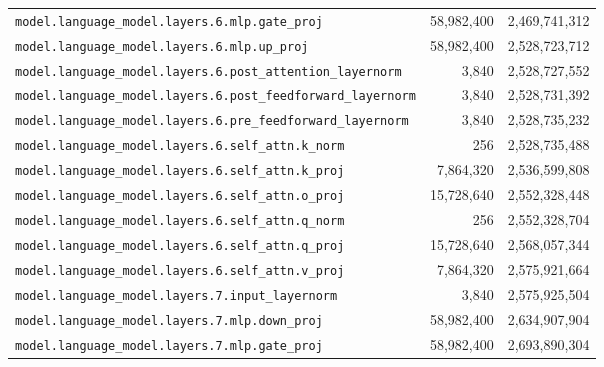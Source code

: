 \documentclass[10pt,a4paper]{article}
\theoremstyle{definition}
\begin{document}
\begin{appendices}
\begin{longtable}{p{9.5cm}rr}
\texttt{model.\allowbreak{}language\_model.\allowbreak{}layers.\allowbreak{}6.\allowbreak{}mlp.\allowbreak{}gate\_proj} & 58,982,400 & 2,469,741,312 \\
\texttt{model.\allowbreak{}language\_model.\allowbreak{}layers.\allowbreak{}6.\allowbreak{}mlp.\allowbreak{}up\_proj} & 58,982,400 & 2,528,723,712 \\
\texttt{model.\allowbreak{}language\_model.\allowbreak{}layers.\allowbreak{}6.\allowbreak{}post\_attention\_layernorm} & 3,840 & 2,528,727,552 \\
\texttt{model.\allowbreak{}language\_model.\allowbreak{}layers.\allowbreak{}6.\allowbreak{}post\_feedforward\_layernorm} & 3,840 & 2,528,731,392 \\
\texttt{model.\allowbreak{}language\_model.\allowbreak{}layers.\allowbreak{}6.\allowbreak{}pre\_feedforward\_layernorm} & 3,840 & 2,528,735,232 \\
\texttt{model.\allowbreak{}language\_model.\allowbreak{}layers.\allowbreak{}6.\allowbreak{}self\_attn.\allowbreak{}k\_norm} & 256 & 2,528,735,488 \\
\texttt{model.\allowbreak{}language\_model.\allowbreak{}layers.\allowbreak{}6.\allowbreak{}self\_attn.\allowbreak{}k\_proj} & 7,864,320 & 2,536,599,808 \\
\texttt{model.\allowbreak{}language\_model.\allowbreak{}layers.\allowbreak{}6.\allowbreak{}self\_attn.\allowbreak{}o\_proj} & 15,728,640 & 2,552,328,448 \\
\texttt{model.\allowbreak{}language\_model.\allowbreak{}layers.\allowbreak{}6.\allowbreak{}self\_attn.\allowbreak{}q\_norm} & 256 & 2,552,328,704 \\
\texttt{model.\allowbreak{}language\_model.\allowbreak{}layers.\allowbreak{}6.\allowbreak{}self\_attn.\allowbreak{}q\_proj} & 15,728,640 & 2,568,057,344 \\
\texttt{model.\allowbreak{}language\_model.\allowbreak{}layers.\allowbreak{}6.\allowbreak{}self\_attn.\allowbreak{}v\_proj} & 7,864,320 & 2,575,921,664 \\
\texttt{model.\allowbreak{}language\_model.\allowbreak{}layers.\allowbreak{}7.\allowbreak{}input\_layernorm} & 3,840 & 2,575,925,504 \\
\texttt{model.\allowbreak{}language\_model.\allowbreak{}layers.\allowbreak{}7.\allowbreak{}mlp.\allowbreak{}down\_proj} & 58,982,400 & 2,634,907,904 \\
\texttt{model.\allowbreak{}language\_model.\allowbreak{}layers.\allowbreak{}7.\allowbreak{}mlp.\allowbreak{}gate\_proj} & 58,982,400 & 2,693,890,304 \\

\end{longtable}
\end{appendices}
\end{document}
